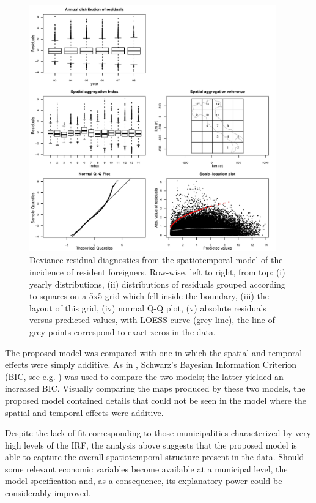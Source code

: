 \begin{figure}[tbp]
	\centering
		\includegraphics[width=0.95\textwidth]{it/spatind/diag-deviance}
	\caption{\label{cor-r26}Deviance residual diagnostics from the spatiotemporal model of the incidence of resident foreigners. Row-wise, left to right, from top: (i) yearly distributions, (ii) distributions of residuals grouped according to squares on a 5x5 grid which fell inside the boundary, (iii) the layout of this grid, (iv) normal Q-Q plot, (v) absolute residuals versus predicted values, with LOESS curve (grey line), the line of grey points correspond to exact zeros in the data.}
	\label{Resid}
\end{figure}

The proposed model was compared with one in which the spatial and temporal effects were simply additive. As in , Schwarz's Bayesian Information Criterion (BIC, see e.g. \cite[p. 286]{burnhamanderson}) was used to compare the two models; the latter yielded an increased BIC. Visually comparing the maps produced by these two models, the proposed model contained details that could not be seen in the model where the spatial and temporal effects were additive.

Despite the lack of fit corresponding to those municipalities characterized by very high levels of the IRF, the analysis above suggests that the proposed model is able to capture the overall spatiotemporal structure present in the data. Should some relevant economic variables become available at a municipal level, the model specification and, as a consequence, its explanatory power could be considerably improved. 

